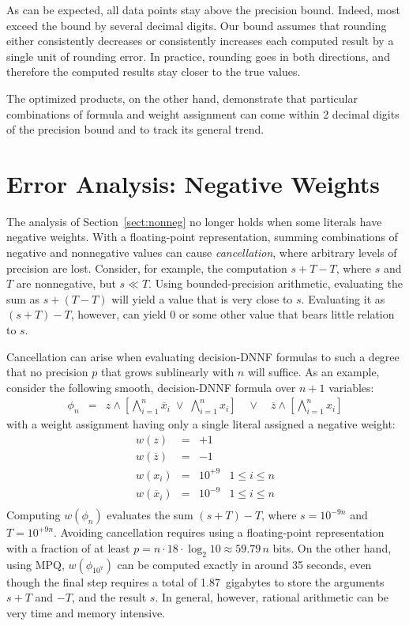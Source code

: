 \documentclass[letterpaper,USenglish,cleveref, autoref, thm-restate]{lipics-v2021}
\newcommand{\obar}[1]{\overline{#1}}
\begin{document}
As can
be expected, all data points stay above the precision bound.  Indeed,
most exceed the bound by several decimal digits.  Our bound assumes
that rounding either consistently decreases or consistently
increases each computed result by a single unit of rounding error.  In
practice, rounding goes in both directions, and
therefore the computed results stay closer to the true values.

The optimized products, on the other hand, demonstrate that particular
combinations of formula and weight assignment can come within 2 decimal digits of the
precision bound and to track its general trend.

\section{Error Analysis: Negative Weights}
\label{sect:neg}

The analysis of Section~\ref{sect:nonneg} no longer holds when
some literals have negative weights.  With a floating-point
representation, summing combinations of negative and nonnegative
values can cause \emph{cancellation}, where arbitrary levels of
precision are lost.  Consider, for example, the computation
$s + T - T$, where $s$ and $T$ are nonnegative, but $s \ll T$.  Using
bounded-precision arithmetic, evaluating the sum as $s + (T - T)$ will yield a value
that is very close to $s$.
Evaluating it as $(s + T) - T$, however, can yield $0$ or some other value that bears little relation to $s$.

Cancellation can arise when evaluating decision-DNNF formulas to such a degree that no precision $p$ that grows sublinearly with $n$ will suffice.
As an example, consider the following smooth, decision-DNNF formula over $n+1$ variables:
\begin{eqnarray}
\phi_n  & = & z \land \left[\bigwedge_{i = 1}^{n} \obar{x}_i \; \lor \; \bigwedge_{i = 1}^{n} x_i\right] \quad \lor \quad \obar{z} \land \left [\bigwedge_{i = 1}^{n} x_i\right] \label{eqn:max:precision}
\end{eqnarray}
with a weight assignment having only a single literal assigned a negative weight:
\begin{displaymath}
\begin{array}{llll}
  w(z) & = & +1 \\
  w(\obar{z}) & = & -1 \\
  w(x_i) & = & 10^{+9} & 1 \leq i \leq n \\
  w(\obar{x}_i) & = & 10^{-9} & 1 \leq i \leq n \\
\end{array}
\end{displaymath}
Computing $w(\phi_n)$  evaluates the sum $(s + T) - T$, where
$s = 10^{-9n}$ and $T = 10^{+9n}$.  Avoiding cancellation requires using a floating-point representation with a fraction of at least
$p = n \cdot 18 \cdot \log_2 10 \approx 59.79 \, n$ bits.
On the other hand, using MPQ, $w(\phi_{10^7})$ can be computed exactly in around 35 seconds, even though the final step requires a total of 1.87~gigabytes to store the arguments
$s+T$ and $-T$, and the result $s$.  In general, however, rational arithmetic can be very time and memory intensive.
\end{document}
